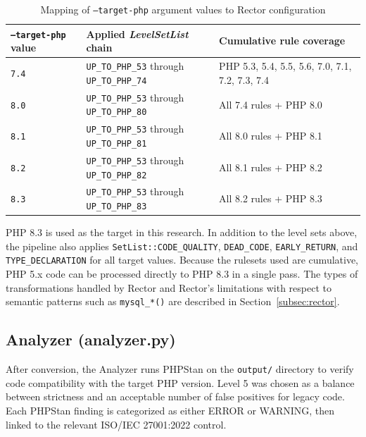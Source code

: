 \begin{table}[htbp]
\caption{Mapping of \texttt{--target-php} argument values to Rector configuration}
\vspace{0.5em}
\centering
\label{tab:rector-levelset}
\renewcommand{\arraystretch}{1.4}
\begin{tabularx}{\textwidth}{|l|>{\raggedright\arraybackslash}X|>{\raggedright\arraybackslash}X|}
\hline
\textbf{\texttt{--target-php} value} & \textbf{Applied \textit{LevelSetList} chain} & \textbf{Cumulative rule coverage} \\
\hline \hline

\texttt{7.4} & \texttt{UP\_TO\_PHP\_53} through \texttt{UP\_TO\_PHP\_74} & PHP 5.3, 5.4, 5.5, 5.6, 7.0, 7.1, 7.2, 7.3, 7.4 \\
\hline

\texttt{8.0} & \texttt{UP\_TO\_PHP\_53} through \texttt{UP\_TO\_PHP\_80} & All 7.4 rules + PHP 8.0 \\
\hline

\texttt{8.1} & \texttt{UP\_TO\_PHP\_53} through \texttt{UP\_TO\_PHP\_81} & All 8.0 rules + PHP 8.1 \\
\hline

\texttt{8.2} & \texttt{UP\_TO\_PHP\_53} through \texttt{UP\_TO\_PHP\_82} & All 8.1 rules + PHP 8.2 \\
\hline

\texttt{8.3} & \texttt{UP\_TO\_PHP\_53} through \texttt{UP\_TO\_PHP\_83} & All 8.2 rules + PHP 8.3 \\
\hline

\end{tabularx}
\end{table}

PHP 8.3 is used as the target in this research. In addition to the level sets above, the pipeline also applies \texttt{SetList::CODE\_QUALITY}, \texttt{DEAD\_CODE}, \texttt{EARLY\_RETURN}, and \texttt{TYPE\_DECLARATION} for all target values. Because the rulesets used are cumulative, PHP 5.x code can be processed directly to PHP 8.3 in a single pass. The types of transformations handled by Rector and Rector's limitations with respect to semantic patterns such as \texttt{mysql\_*()} are described in Section~\ref{subsec:rector}.

\subsection{Analyzer (analyzer.py)}

After conversion, the Analyzer runs PHPStan on the \texttt{output/} directory to verify code compatibility with the target PHP version. Level 5 was chosen as a balance between strictness and an acceptable number of false positives for legacy code. Each PHPStan finding is categorized as either ERROR or WARNING, then linked to the relevant ISO/IEC 27001:2022 control.

